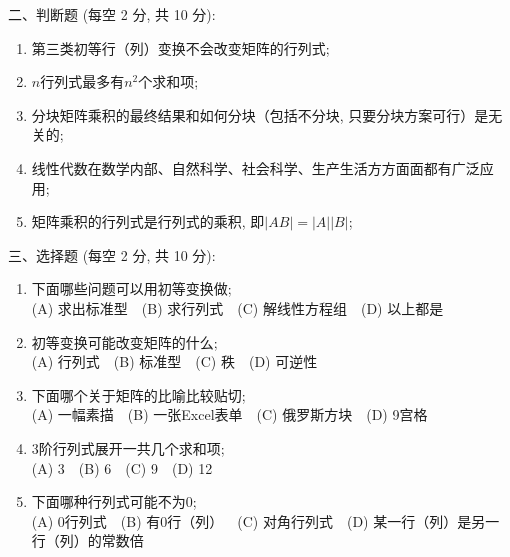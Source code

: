 \documentclass[12pt,a4paper]{ctexart}%
\begin{document}
%
\noindent 二、判断题 (每空 2 分, 共 10 分):%
\begin{enumerate}[1)]%
\item%
第三类初等行（列）变换不会改变矩阵的行列式;~~\true%
\item%
$n$行列式最多有$n^2$个求和项;~~\false%
\item%
分块矩阵乘积的最终结果和如何分块（包括不分块, 只要分块方案可行）是无关的;~~\true%
\item%
线性代数在数学内部、自然科学、社会科学、生产生活方方面面都有广泛应用;~~\true%
\item%
矩阵乘积的行列式是行列式的乘积, 即$|AB|=|A||B|$;~~\true%
\end{enumerate}%


%
\noindent 三、选择题 (每空 2 分, 共 10 分):%
\begin{enumerate}[1)]%
\item%
下面哪些问题可以用初等变换做;~~\\
(A) 求出标准型~~(B) 求行列式~~(C) 解线性方程组~~(D) 以上都是%
\item%
初等变换可能改变矩阵的什么;~~\\
(A) 行列式~~(B) 标准型~~(C) 秩~~(D) 可逆性%
\item%
下面哪个关于矩阵的比喻比较贴切;~~\\
(A) 一幅素描~~(B) 一张Excel表单~~(C) 俄罗斯方块~~(D) 9宫格%
\item%
3阶行列式展开一共几个求和项;~~\\
(A) 3~~(B) 6~~(C) 9~~(D) 12%
\item%
下面哪种行列式可能不为0;~~\\
(A) 0行列式~~(B) 有0行（列）~~(C) 对角行列式~~(D) 某一行（列）是另一行（列）的常数倍%
\end{enumerate}%
\end{document}
